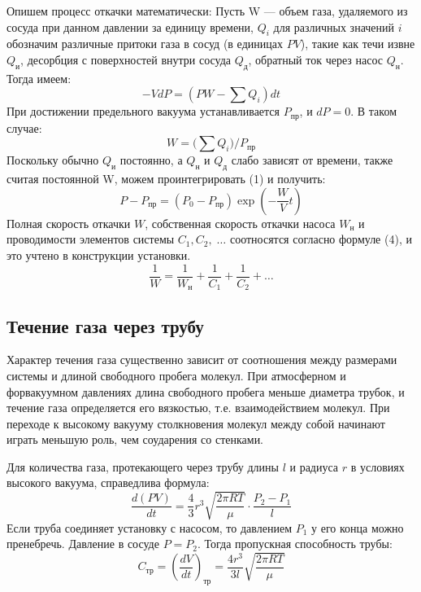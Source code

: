 \documentclass[a4paper,12pt]{article}
\theoremstyle{definition}
\begin{document}
	Опишем процесс откачки математически: 
	Пусть W --- объем газа, удаляемого из сосуда при данном давлении за единицу времени, $Q_i$ для различных значений $i$ обозначим различные притоки газа в сосуд (в единицах $PV$), такие как течи извне $Q_\text{и}$, десорбция с поверхностей внутри сосуда $Q_\text{д}$, обратный ток через насос $Q_\text{н}$. Тогда имеем:
	\begin{equation}
		-VdP = \left(PW - \sum Q_i\right)dt
	\end{equation}
	При достижении предельного вакуума устанавливается $P_{\text{пр}}$, и $dP = 0$. В таком случае:
	\begin{equation}
		W = \biggl( \sum Q_i \biggr)\bigg/ P_{\text{пр}}
	\end{equation}
	Поскольку обычно $Q_\text{и}$ постоянно, а $Q_\text{н}$ и $Q_\text{д}$ слабо зависят от времени, также считая постоянной W, можем проинтегрировать (1) и получить:
	\begin{equation}
		P - P_{\text{пр}} = (P_0 - P_{\text{пр}})\exp\left(-\frac{W}{V}t\right)
		\label{exp}
	\end{equation}
	Полная скорость откачки $W$, собственная скорость откачки насоса $W_{\text{н}}$ и проводимости элементов системы $C_1, C_2,\;\ldots$ соотносятся согласно формуле (4), и это учтено в конструкции установки.
	\begin{equation}
		\frac{1}{W} = \frac{1}{W_\text{н}} + \frac{1}{C_1} + \frac{1}{C_2} + \ldots
	\end{equation}
	
	\subsection{Течение газа через трубу}
	
	Характер течения газа существенно зависит от соотношения между размерами системы и длиной свободного пробега молекул. При атмосферном и форвакуумном давлениях  длина свободного пробега меньше диаметра трубок, и течение газа определяется его вязкостью, т.е. взаимодействием молекул. При переходе к высокому вакууму столкновения молекул между собой начинают играть меньшую роль, чем соударения со стенками.
	
	Для количества газа, протекающего через трубу длины $l$ и радиуса $r$ в условиях высокого вакуума, справедлива формула:
	\begin{equation}
		\frac{d(PV)}{dt} = \frac{4}{3}r^3\sqrt{\frac{2\pi RT}{\mu}}\cdot\frac{P_2 - P_1}{l}
	\end{equation}
	Если труба соединяет установку с насосом, то давлением $P_1$ у его конца можно пренебречь. Давление в сосуде $P = P_2$. Тогда пропускная способность трубы:
	\begin{equation}
		C_\text{тр} = \left(\frac{dV}{dt}\right)_\text{тр} = \frac{4r^3}{3l}\sqrt{\frac{2\pi RT}{\mu}}
		\label{ty}
	\end{equation}
	
\end{document}
